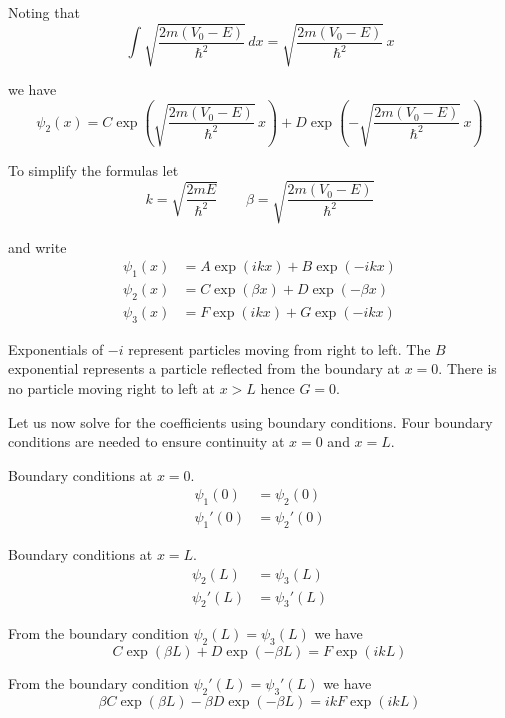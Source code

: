 Noting that
\begin{equation*}
\int\sqrt{\frac{2m(V_0-E)}{\hbar^2}}\,dx
=\sqrt{\frac{2m(V_0-E)}{\hbar^2}}\,x
\end{equation*}

we have
\begin{equation*}
\psi_2(x)=
C\exp\left(\sqrt{\frac{2m(V_0-E)}{\hbar^2}}\,x\right)
+D\exp\left(-\sqrt{\frac{2m(V_0-E)}{\hbar^2}}\,x\right)
\end{equation*}

To simplify the formulas let
\begin{equation*}
k=\sqrt{\frac{2mE}{\hbar^2}}
\qquad
\beta=\sqrt{\frac{2m(V_0-E)}{\hbar^2}}
\end{equation*}

and write
\begin{align*}
\psi_1(x)&=A\exp(ikx)+B\exp(-ikx)
\\
\psi_2(x)&=C\exp(\beta x)+D\exp(-\beta x)
\\
\psi_3(x)&=F\exp(ikx)+G\exp(-ikx)
\end{align*}

Exponentials of $-i$ represent particles moving from right to left.
The $B$ exponential represents a particle reflected from the
boundary at $x=0$.
There is no particle moving right to left at $x>L$ hence $G=0$.

\bigskip
Let us now solve for the coefficients using boundary conditions.
Four boundary conditions are needed to ensure continuity
at $x=0$ and $x=L$.

\bigskip
Boundary conditions at $x=0$.
\begin{align*}
\psi_1(0)&=\psi_2(0)
\\
\psi_1'(0)&=\psi_2'(0)
\end{align*}

Boundary conditions at $x=L$.
\begin{align*}
\psi_2(L)&=\psi_3(L)
\\
\psi_2'(L)&=\psi_3'(L)
\end{align*}

From the boundary condition $\psi_2(L)=\psi_3(L)$ we have
\begin{equation*}
C\exp(\beta L)+D\exp(-\beta L)=F\exp(ikL)
\tag{1}
\end{equation*}

From the boundary condition $\psi_2'(L)=\psi_3'(L)$ we have
\begin{equation*}
\beta C\exp(\beta L)-\beta D\exp(-\beta L)
=ikF\exp(ikL)
\tag{2}
\end{equation*}

